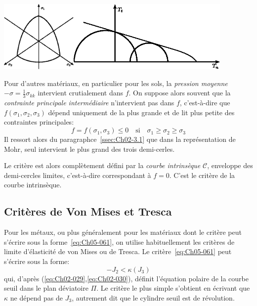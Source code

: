     \begin{center}
        \includegraphics[height=3.5cm]{../images/T1_Ch05-02}\qquad \includegraphics[height=3.5cm]{../images/T1_Ch05-03}
    \end{center}

Pour d'autres matériaux, en particulier pour les sols, la \emph{pression moyenne} $-\sigma = \frac{1}{3}\sigma_{kk}$ intervient crutialement dans $f$.
On suppose alors souvent que la \emph{contrainte principale intermédiaire} n'intervient pas dans $f$, c'est-à-dire que $f\left( \sigma_1, \sigma_{2}, \sigma_3 \right)$ dépend uniquement de la plus grande et de lit plus petite des contraintes principales:
\begin{equation}
    f = f\left( \sigma_1, \sigma_3 \right) \leq 0 \quad \text{si} \quad \sigma_1 \geq \sigma_2 \geq \sigma_3
    \label{eq:Ch05-062}
\end{equation}
Il ressort alors du paragraphce~\ref{ssec:Ch02-3.1} que dans la représentation de Mohr, seul intervient le plus grand des trois demi-cerles.

Le critère est alors complètement défini par la \emph{courbe intrinsèque} $\mathcal{C}$, enveloppe des demi-cercles limites, c'est-à-dire correspondant à $f=0$. 
C'est le critère de la courbe intrinsèque.

\subsection{Critères de Von Mises et Tresca} \label{ssec:Ch05-3.2}
Pour les métaux, ou plus généralement pour les matériaux dont le critère peut s'écrire sous la forme~\eqref{eq:Ch05-061}, on utilise habituellement les critères de limite d'élasticité de von Mises ou de Tresca.
Le critère~\eqref{eq:Ch05-061} peut s'écrire sous la forme: 
\begin{equation}
    -J_2 < \kappa\left( J_3 \right)
    \label{eq:Ch05-063}
\end{equation}
qui, d'après (\ref{eq:Ch02-029},\ref{eq:Ch02-030}), définit l'équation polaire de la courbe seuil dans le plan déviatoire  $\Pi$.
Le critère le plus simple s'obtient en écrivant que $\kappa$ ne dépend pas de $J_3$, autrement dit que le cylindre seuil est de révolution.

